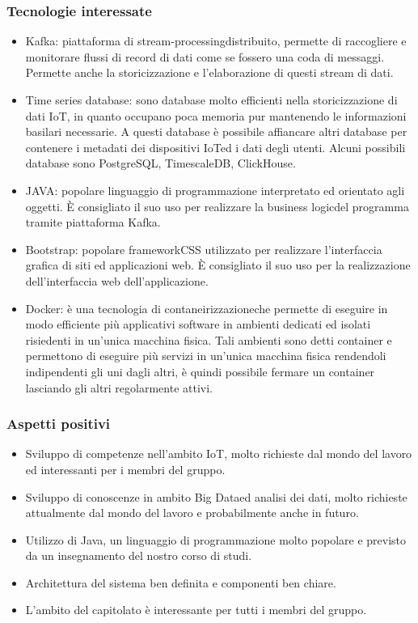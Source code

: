 \subsubsection{Tecnologie interessate}
\begin{itemize}
	\item Kafka\glosp: piattaforma di stream-processing\glosp distribuito, permette di raccogliere e monitorare flussi di record di dati come se fossero una coda di messaggi. Permette anche la storicizzazione e l'elaborazione di questi stream di dati.	
	\item Time series database\glosp: sono database molto efficienti nella storicizzazione di dati IoT\glo, in quanto occupano poca memoria pur mantenendo le informazioni basilari necessarie. A questi database è possibile affiancare altri database per contenere i metadati dei dispositivi IoT\glosp ed i dati degli utenti. Alcuni possibili database sono PostgreSQL\glo, TimescaleDB\glo, ClickHouse\glo.
	\item JAVA\glosp: popolare linguaggio di programmazione interpretato ed orientato agli oggetti. È consigliato il suo uso per realizzare la business logic\glosp del programma tramite piattaforma Kafka\glo.
	\item Bootstrap\glosp: popolare framework\glosp CSS utilizzato per realizzare l'interfaccia grafica di siti ed applicazioni web. È consigliato il suo uso per la realizzazione dell'interfaccia web dell'applicazione.
	\item Docker\glosp: è una tecnologia di contaneirizzazione\glosp che permette di eseguire in modo efficiente più applicativi software in ambienti dedicati ed isolati risiedenti in un'unica macchina fisica. Tali ambienti sono detti container e permettono di eseguire più servizi in un'unica macchina fisica rendendoli indipendenti gli uni dagli altri, è quindi possibile fermare un container lasciando gli altri regolarmente attivi.
\end{itemize} 
\subsubsection{Aspetti positivi}
\begin{itemize} 
	\item Sviluppo di competenze nell'ambito IoT\glo, molto richieste dal mondo del lavoro ed interessanti per i membri del gruppo.
	\item Sviluppo di conoscenze in ambito Big Data\glosp ed analisi dei dati, molto richieste attualmente dal mondo del lavoro e probabilmente anche in futuro.
	\item Utilizzo di Java, un linguaggio di programmazione molto popolare e previsto da un insegnamento del nostro corso di studi.
	\item Architettura del sistema ben definita e componenti ben chiare.
	\item L'ambito del capitolato è interessante per tutti i membri del gruppo.
\end{itemize}
